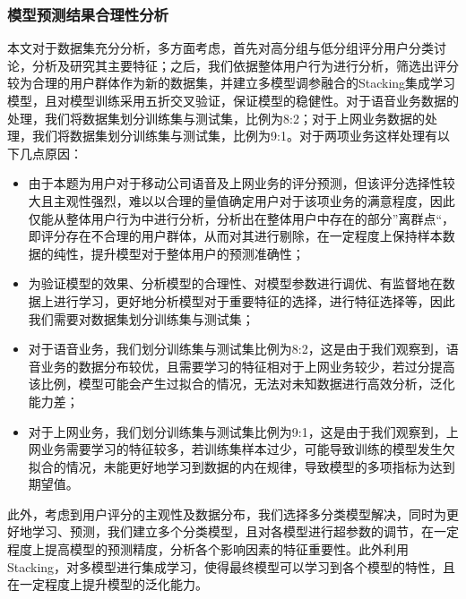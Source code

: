 \documentclass{MathorCupmodeling}
\begin{document}
	\subsubsection{模型预测结果合理性分析}
	本文对于数据集充分分析，多方面考虑，首先对高分组与低分组评分用户分类讨论，分析及研究其主要特征；之后，我们依据整体用户行为进行分析，筛选出评分较为合理的用户群体作为新的数据集，并建立多模型调参融合的Stacking集成学习模型，且对模型训练采用五折交叉验证，保证模型的稳健性。对于语音业务数据的处理，我们将数据集划分训练集与测试集，比例为8:2；对于上网业务数据的处理，我们将数据集划分训练集与测试集，比例为9:1。对于两项业务这样处理有以下几点原因：
	\begin{itemize}
		\item 由于本题为用户对于移动公司语音及上网业务的评分预测，但该评分选择性较大且主观性强烈，难以以合理的量值确定用户对于该项业务的满意程度，因此仅能从整体用户行为中进行分析，分析出在整体用户中存在的部分”离群点“，即评分存在不合理的用户群体，从而对其进行剔除，在一定程度上保持样本数据的纯性，提升模型对于整体用户的预测准确性；
		\item 为验证模型的效果、分析模型的合理性、对模型参数进行调优、有监督地在数据上进行学习，更好地分析模型对于重要特征的选择，进行特征选择等，因此我们需要对数据集划分训练集与测试集；
		\item 对于语音业务，我们划分训练集与测试集比例为8:2，这是由于我们观察到，语音业务的数据分布较优，且需要学习的特征相对于上网业务较少，若过分提高该比例，模型可能会产生过拟合的情况，无法对未知数据进行高效分析，泛化能力差；
		\item 对于上网业务，我们划分训练集与测试集比例为9:1，这是由于我们观察到，上网业务需要学习的特征较多，若训练集样本过少，可能导致训练的模型发生欠拟合的情况，未能更好地学习到数据的内在规律，导致模型的多项指标为达到期望值。
	\end{itemize}
	
	此外，考虑到用户评分的主观性及数据分布，我们选择多分类模型解决，同时为更好地学习、预测，我们建立多个分类模型，且对各模型进行超参数的调节，在一定程度上提高模型的预测精度，分析各个影响因素的特征重要性。此外利用Stacking，对多模型进行集成学习，使得最终模型可以学习到各个模型的特性，且在一定程度上提升模型的泛化能力。
\end{document}
